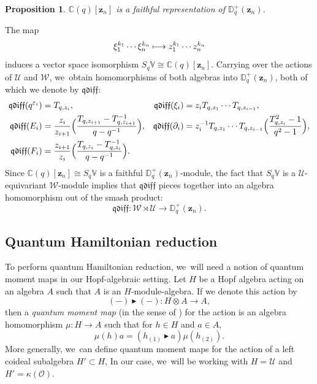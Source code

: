 \documentclass[11pt]{article}
\let\epsilon\varepsilon
\newcommand\mto{\mathchoice{\longmapsto}{\mapsto}{\mapsto}{\mapsto}}
\newtheorem{prop}[thm]{Proposition}
\theoremstyle{definition}
\newcommand{\CC}{\mathbb{C}}
\newcommand{\OO}{\mathcal{O}}
\newcommand{\UU}{\mathcal{U}}
\newcommand{\WW}{\mathcal{W}}
\begin{document}
\begin{prop}
$\CC(q)[\boldsymbol{z}_n]$ is a faithful representation of $\mathbb{D}_q^+(\boldsymbol{z}_n)$.
\end{prop}

The map
\[
\xi_1^{k_1}\cdots \xi_n^{k_n}\mto z_1^{k_1}\cdots z_n^{k_n}
\]
induces a vector space isomorphism $S_q\mathbb{V}\cong\CC(q)[\boldsymbol{z}_n]$.
Carrying over the actions of $\UU$ and $\WW$, we~obtain homomorphisms of both algebras into $\mathbb{D}_q^+(\boldsymbol{z}_n)$, both of which we denote by $\mathfrak{qdiff}$:
\begin{equation}
\begin{aligned}
\mathfrak{qdiff}(q^{\epsilon_i})&= T_{q,z_i},&
\mathfrak{qdiff}(\xi_i)&=z_i T_{q, z_1}\cdots T_{q,z_{i-1}},\\
\mathfrak{qdiff}(E_i)&= \frac{z_{i}}{z_{i+1}}\Bigl(\frac{T_{q,z_{i+1}}-T_{q, z_{i+1}}^{-1}}{q-q^{-1}} \Bigr),&
\mathfrak{qdiff}(\partial_i)&= z_i^{-1}T_{q,z_1}\cdots T_{q,z_{i-1}}\Bigl(\frac{T_{q,z_i}^2-1}{q^2-1} \Bigr),\\
\mathfrak{qdiff}(F_i)&= \frac{z_{i+1}}{z_i}\Bigl(\frac{T_{q,z_i}-T_{q, z_i}^{-1}}{q-q^{-1}} \Bigr).
\end{aligned}
\label{QDiffMap}
\end{equation}
Since $\CC(q)[\boldsymbol{z}_n]\cong S_q\mathbb{V}$ is a faithful $\mathbb{D}^+_q(\boldsymbol{z}_n)$-module, the fact that $S_q\mathbb{V}$ is a $\UU$-equivariant $\WW$-module implies that $\mathfrak{qdiff}$ pieces together into an algebra homomorphism out of the smash product:
\[
\mathfrak{qdiff}:\WW\rtimes\UU\to\mathbb{D}^+_q(\boldsymbol{z}_n).
\]

\subsection{Quantum Hamiltonian reduction}
To perform quantum Hamiltonian reduction, we~will need a notion of quantum moment maps in our Hopf-algebraic setting.
Let $H$ be a Hopf algebra acting on an algebra $A$ such that $A$ is an $H$-module-algebra.
If we denote this action by
\[
(-)\blacktriangleright(-):H\otimes A\to A,
\]
then a \textit{quantum moment map} (in the sense of \cite{VarVassRoot}) for the action is an algebra homomorphism $\mu:H\to A$ such that for $h\in H$ and $a\in A$,
\begin{equation}
\mu(h)a=(h_{(1)}\blacktriangleright a)\mu(h_{(2)}).
\label{QMMDef}
\end{equation}
More generally, we~can define quantum moment maps for the action of a left coideal subalgebra $H'\subset H$,
In our case, we~will be working with $H=\UU$ and $H'=\kappa(\OO)$.
\end{document}

